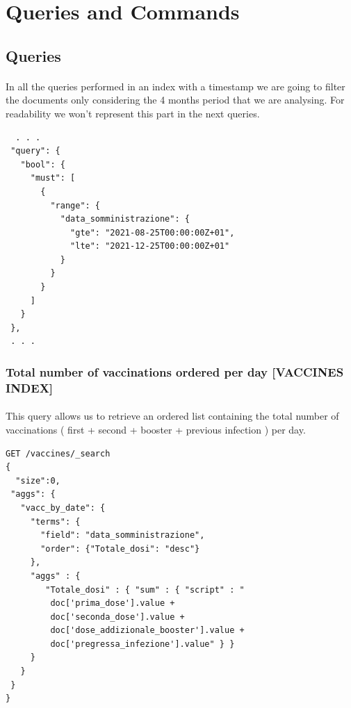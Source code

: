 \documentclass[a4paper,12pt]{article}
\begin{document}
\section{Queries and Commands}
\subsection{Queries}
\paragraph{} In all the queries performed in an index with a timestamp we are going to filter the documents only considering the 4 months period that we are analysing. For readability we won't represent this part in the next queries.
\begin{tcolorbox}[colback=pink!5!white,colframe=pink!75!black,title=FILTER]
\begin{verbatim}
  . . .
 "query": {
   "bool": {
     "must": [
       {
         "range": {
           "data_somministrazione": {
             "gte": "2021-08-25T00:00:00Z+01",
             "lte": "2021-12-25T00:00:00Z+01"
           }
         }
       }
     ]
   }
 },
 . . .
\end{verbatim}
\end{tcolorbox}
\newpage

\subsubsection{Total number of vaccinations ordered per day [VACCINES INDEX]}
\paragraph{} This query allows us to retrieve an ordered list containing the total number of vaccinations ( first + second + booster + previous infection ) per day.
\begin{tcolorbox}[colback=green!5!white,colframe=green!75!black,title=QUERY]
\begin{verbatim}
GET /vaccines/_search
{
  "size":0,
 "aggs": {
   "vacc_by_date": {
     "terms": {
       "field": "data_somministrazione",
       "order": {"Totale_dosi": "desc"}
     },
     "aggs" : {
        "Totale_dosi" : { "sum" : { "script" : "
         doc['prima_dose'].value +
         doc['seconda_dose'].value + 
         doc['dose_addizionale_booster'].value +
         doc['pregressa_infezione'].value" } }
     }
   }
 }
}
\end{verbatim}
\end{tcolorbox}
\newpage
\end{document}
